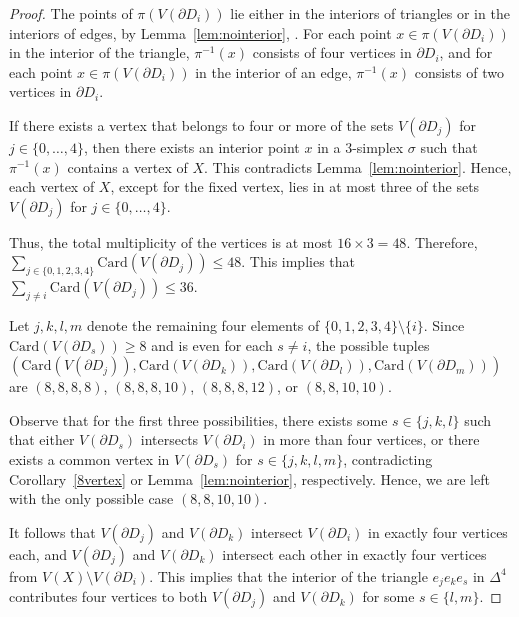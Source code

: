 \documentclass[10pt,a4paper]{amsart}
\newcommand{\D}{\Delta}
\begin{document}
\begin{proof}
The points of $\pi(V(\partial D_i))$ lie either in the interiors of triangles or in the interiors of edges, by Lemma~\ref{lem:nointerior}, . For each point $x\in \pi(V(\partial D_i))$ in the interior of the triangle, $\pi^{-1}(x)$ consists of four vertices in $\partial D_i$, and for each point $x\in \pi(V(\partial D_i))$ in the interior of an edge, $\pi^{-1}(x)$ consists of two vertices in $\partial D_i$.

If there exists a vertex that belongs to four or more of the sets $V(\partial D_j)$ for $j\in\{0,\ldots,4\}$, then there exists an interior point $x$ in a $3$-simplex $\sigma$ such that $\pi^{-1}(x)$ contains a vertex of $X$. This contradicts Lemma~\ref{lem:nointerior}. Hence, each vertex of $X$, except for the fixed vertex, lies in at most three of the sets $V(\partial D_j)$ for $j\in\{0,\ldots,4\}$.

Thus, the total multiplicity of the vertices is at most $16 \times 3 = 48$. Therefore, $\sum_{j \in \{0,1,2,3,4\}} \mathrm{Card}(V(\partial D_j)) \le 48$. This implies that $\sum_{j \ne i} \mathrm{Card}(V(\partial D_j)) \le 36$. 

Let $j, k, l, m$ denote the remaining four elements of $\{0,1,2,3,4\} \setminus \{i\}$. Since $\mathrm{Card}(V(\partial D_s)) \ge 8$ and is even for each $s \ne i$, the possible tuples $(\mathrm{Card}(V(\partial D_j)), \mathrm{Card}(V(\partial D_k)), \mathrm{Card}(V(\partial D_l)), \mathrm{Card}(V(\partial D_m)))$ are $(8,8,8,8)$, $(8,8,8,10)$, $(8,8,8,12)$, or $(8,8,10,10)$.

Observe that for the first three possibilities, there exists some $s \in \{j, k, l\}$ such that either $V(\partial D_s)$ intersects $V(\partial D_i)$ in more than four vertices, or there exists a common vertex in $V(\partial D_s)$ for $s \in \{j, k, l, m\}$, contradicting Corollary~\ref{8vertex} or Lemma~\ref{lem:nointerior}, respectively. Hence, we are left with the only possible case $(8,8,10,10)$.

It follows that $V(\partial D_j)$ and $V(\partial D_k)$ intersect $V(\partial D_i)$ in exactly four vertices each, and $V(\partial D_j)$ and $V(\partial D_k)$ intersect each other in exactly four vertices from $V(X) \setminus V(\partial D_i)$. This implies that the interior of the triangle $e_j e_k e_s$ in $\D^4$ contributes four vertices to both $V(\partial D_j)$ and $V(\partial D_k)$ for some $s \in \{l, m\}$. 


\end{proof}
\end{document}
